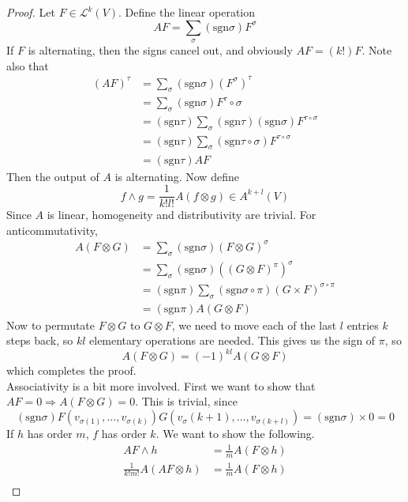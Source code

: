 \documentclass[12pt]{article}
\begin{document}
\begin{proof}
    Let $F \in \mathcal L^k(V)$. Define the linear operation
    $$AF = \sum_\sigma (\text{sgn}\sigma)F^\sigma$$
    If $F$ is alternating, then the signs cancel out, and obviously $AF = (k!)F$. Note also that
    \begin{align*}
        (AF)^\tau &= \sum_\sigma (\text{sgn}\sigma)(F^\sigma)^\tau \\
                  &= \sum_\sigma (\text{sgn}\sigma)F^\tau\circ\sigma \\
                  &= (\text{sgn}\tau) \sum_\sigma (\text{sgn}\tau)(\text{sgn}\sigma) F^{\tau\circ\sigma} \\
                  &= (\text{sgn}\tau) \sum_\sigma (\text{sgn}\tau\circ\sigma)F^{\tau\circ\sigma} \\
                  &= (\text{sgn}\tau)AF
    \end{align*}
    Then the output of $A$ is alternating. Now define
    $$f \wedge g = \frac{1}{k!l!} A(f \otimes g) \in A^{k+l}(V)$$
    Since $A$ is linear, homogeneity and distributivity are trivial. For anticommutativity,
    \begin{align*}
        A(F \otimes G) &= \sum_\sigma (\text{sgn}\sigma)(F \otimes G)^\sigma \\
                       &= \sum_\sigma (\text{sgn}\sigma)((G \otimes F)^\pi)^\sigma \\
                       &= (\text{sgn}\pi) \sum_\sigma (\text{sgn}\sigma\circ\pi) (G \times F)^{\sigma\circ\pi} \\
                       &= (\text{sgn}\pi) A(G \otimes F)
    \end{align*}
    Now to permutate $F \otimes G$ to $G \otimes F$, we need to move each of the last $l$ entries $k$ steps back, so $kl$ elementary operations are needed. This gives us the sign of $\pi$, so
    $$A(F \otimes G) = (-1)^{kl} A(G \otimes F)$$
    which completes the proof. \\
    Associativity is a bit more involved. First we want to show that $AF = 0 \Rightarrow A(F \otimes G) = 0$. This is trivial, since
    $$(\text{sgn}\sigma)F(v_{\sigma(1)},\dots,v_{\sigma(k)})G(v_\sigma(k+1),\dots,v_{\sigma(k+l)}) = (\text{sgn}\sigma) \times 0 = 0$$
    If $h$ has order $m$, $f$ has order $k$. We want to show the following.
    \begin{align*}
        AF \wedge h &= \frac{1}{m} A(F \otimes h) \\
        \frac{1}{k!m!}A(AF \otimes h) &= \frac{1}{m}A(F \otimes h) \\

\end{align*}
\end{proof}
\end{document}

